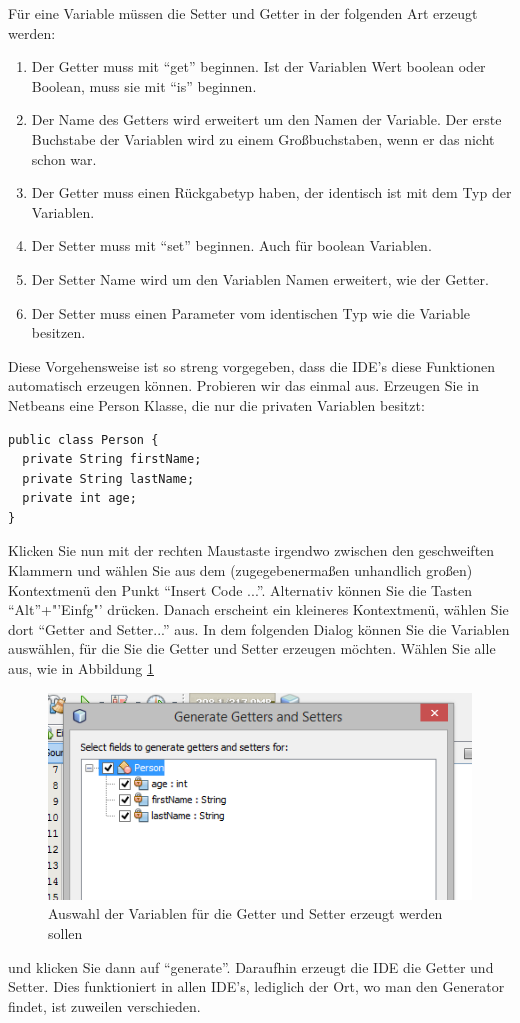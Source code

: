 Für eine Variable müssen die Setter und Getter in der folgenden Art erzeugt werden:

\begin{enumerate}
\item Der Getter muss mit "`get"' beginnen. Ist der Variablen Wert boolean oder Boolean, muss sie mit "`is"' beginnen.
\item Der Name des Getters wird erweitert um den Namen der Variable. Der erste Buchstabe der Variablen wird zu einem Großbuchstaben, wenn er das nicht schon war.
\item Der Getter muss einen Rückgabetyp haben, der identisch ist mit dem Typ der Variablen.
\item Der Setter muss mit "`set"' beginnen. Auch für boolean Variablen.
\item Der Setter Name wird um den Variablen Namen erweitert, wie der Getter. 
\item Der Setter muss einen Parameter vom identischen Typ wie die Variable besitzen. 
\end{enumerate}
Diese Vorgehensweise ist so streng vorgegeben, dass die IDE's diese Funktionen automatisch erzeugen können. Probieren wir das einmal aus. Erzeugen Sie in Netbeans eine Person Klasse, die nur die privaten Variablen besitzt:

\begin{lstlisting}
public class Person {
  private String firstName;
  private String lastName;
  private int age;
}
\end{lstlisting}
Klicken Sie nun mit der rechten Maustaste irgendwo zwischen den geschweiften Klammern und wählen Sie aus dem (zugegebenermaßen unhandlich gro\-ßen) Kontextmenü den Punkt "`Insert Code ..."'. Alternativ können Sie die Tasten "`Alt"'+"'Einfg"' drücken. Danach erscheint ein kleineres Kontextmenü, wählen Sie dort "`Getter and Setter..."' aus. In dem folgenden Dialog können Sie die Variablen auswählen, für die Sie die Getter und Setter erzeugen möchten. Wählen Sie alle aus, wie in Abbildung \ref{nb:getset}
\begin{figure}[h]
\centering
\includegraphics[width=\textwidth]{img/nb005}
\caption{Auswahl der Variablen für die Getter und Setter erzeugt werden sollen}
\label{nb:getset}
\end{figure}
und klicken Sie dann auf "`generate"'. Daraufhin erzeugt die IDE die Getter und Setter. Dies funktioniert in allen IDE's, lediglich der Ort, wo man den Generator findet, ist zuweilen verschieden. 

